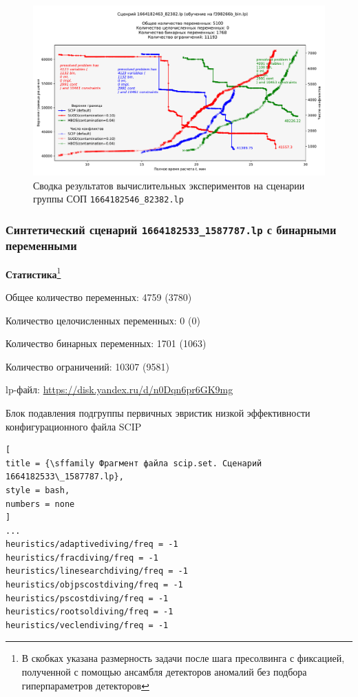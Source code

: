 \documentclass[%
	11pt,
	a4paper,
	utf8,
		]{article}
\begin{document}
\begin{figure}[!h]
	\centering
	\includegraphics[scale=0.58]{figures/1664182546_82382.pdf}
	\caption{ Сводка результатов вычислительных экспериментов на сценарии \\группы СОП \texttt{1664182546\_82382.lp} }\label{fig:1664182546_82382}
\end{figure}


\subsubsection{Синтетический сценарий \texttt{1664182533\_1587787.lp} с бинарными переменными}

\textbf{Статистика}\footnote{В скобках указана размерность задачи после шага пресолвинга с фиксацией, полученной с помощью ансамбля детекторов аномалий без подбора гиперпараметров детекторов}\vspace*{1mm}

Общее количество переменных: 4759 (3780)

Количество целочисленных переменных: 0 (0)

Количество бинарных переменных: 1701 (1063)

Количество ограничений: 10307 (9581)

lp-файл: \url{https://disk.yandex.ru/d/n0Dqn6pr6GK9mg}

Блок подавления подгруппы первичных эвристик низкой эффективности конфигурационного файла SCIP
\begin{lstlisting}[
title = {\sffamily Фрагмент файла scip.set. Сценарий 1664182533\_1587787.lp},
style = bash,
numbers = none
]
...
heuristics/adaptivediving/freq = -1
heuristics/fracdiving/freq = -1
heuristics/linesearchdiving/freq = -1
heuristics/objpscostdiving/freq = -1
heuristics/pscostdiving/freq = -1
heuristics/rootsoldiving/freq = -1
heuristics/veclendiving/freq = -1
\end{lstlisting}
\end{document}
